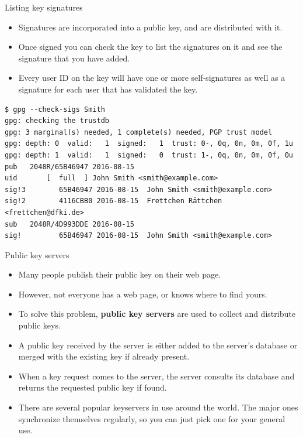 \documentclass[%
mode=present,%
paper=smartboard,
size=20pt,
]{powerdot}
\newcommand\vsp{\vspace{-16mm}}
\begin{document}
\begin{slide}[method=direct]{Listing key signatures}
  \begin{itemize}
  \item Signatures are incorporated into a public key, and are
    distributed with it.
  \item Once signed you can check the key to list the signatures on it
    and see the signature that you have added.
  \item Every user ID on the key will have one or more self-signatures
    as well as a signature for each user that has validated the key.
  \end{itemize}
\vsp
\begin{verbatim}
$ gpg --check-sigs Smith
gpg: checking the trustdb
gpg: 3 marginal(s) needed, 1 complete(s) needed, PGP trust model
gpg: depth: 0  valid:   1  signed:   1  trust: 0-, 0q, 0n, 0m, 0f, 1u
gpg: depth: 1  valid:   1  signed:   0  trust: 1-, 0q, 0n, 0m, 0f, 0u
pub   2048R/65B46947 2016-08-15
uid       [  full  ] John Smith <smith@example.com>
sig!3        65B46947 2016-08-15  John Smith <smith@example.com>
sig!2        4116CBB0 2016-08-15  Frettchen Rättchen <frettchen@dfki.de>
sub   2048R/4D993DDE 2016-08-15
sig!         65B46947 2016-08-15  John Smith <smith@example.com>
\end{verbatim}
\end{slide}

\begin{slide}{Public key servers}
  \begin{itemize}
  \item Many people publish their public key on their web page.
  \item However, not everyone has a web page, or knows where to find
    yours.
  \item To solve this problem, \textbf{public key servers} are used to
    collect and distribute public keys.
  \item A public key received by the server is either added to the
    server's database or merged with the existing key if already
    present.
  \item When a key request comes to the server, the server consults
    its database and returns the requested public key if found.
  \item There are several popular keyservers in use around the world.
    The major ones synchronize themselves regularly, so you can just
    pick one for your general use.
  \end{itemize}
\end{slide}
\end{document}
